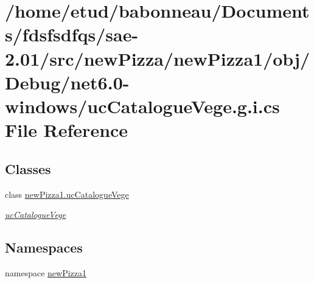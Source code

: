 \hypertarget{net6_80-windows_2ucCatalogueVege_8g_8i_8cs}{}\section{/home/etud/babonneau/\+Documents/fdsfsdfqs/sae-\/2.01/src/new\+Pizza/new\+Pizza1/obj/\+Debug/net6.0-\/windows/uc\+Catalogue\+Vege.g.\+i.\+cs File Reference}
\label{net6_80-windows_2ucCatalogueVege_8g_8i_8cs}
\subsection*{Classes}
\begin{DoxyCompactItemize}
\item 
class \hyperlink{classnewPizza1_1_1ucCatalogueVege}{new\+Pizza1.\+uc\+Catalogue\+Vege}
\begin{DoxyCompactList}\small\item\em \hyperlink{classnewPizza1_1_1ucCatalogueVege}{uc\+Catalogue\+Vege} \end{DoxyCompactList}\end{DoxyCompactItemize}
\subsection*{Namespaces}
\begin{DoxyCompactItemize}
\item 
namespace \hyperlink{namespacenewPizza1}{new\+Pizza1}
\end{DoxyCompactItemize}
